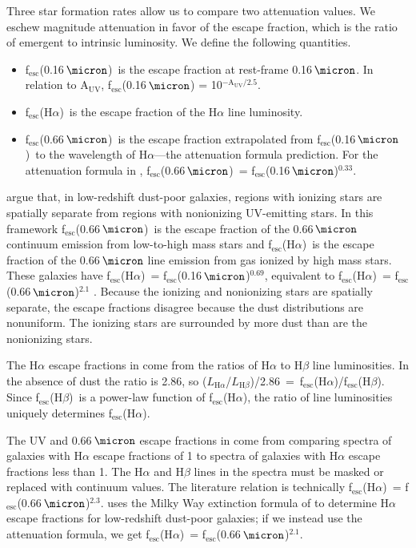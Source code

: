 \documentclass[preprint]{aastex}
\newcommand{\alephuv}{f$_{\mathrm{esc}}$(0.16$\,\micron$)}
\newcommand{\alephha}{f$_{\mathrm{esc}}$(H$\alpha$)}
\newcommand{\alephuvha}{f$_{\mathrm{esc}}$(0.66$\,\micron$)}
\newcommand{\alephhb}{f$_{\mathrm{esc}}$(H$\beta$)}
\begin{document}
Three star formation rates allow us to compare two attenuation values.
We eschew magnitude attenuation in favor of the escape fraction, which
is the ratio of emergent to intrinsic luminosity.  We define the following
quantities.
\begin{itemize}
\item \alephuv~is the escape fraction at rest-frame 0.16$\,\micron$.  In
relation to A$_{\mathrm{UV}}$,
f$_{\mathrm{esc}}$(0.16$\,\micron$) = 10$^{-\mathrm{A}_{\mathrm{UV}}/2.5}$.
\item \alephha~is the escape fraction of the H$\alpha$ line luminosity.
\item \alephuvha~is the escape fraction extrapolated from \alephuv~to the
wavelength of H$\alpha$---the attenuation formula prediction.  For the
attenuation formula in \citet{calzetti00}, \alephuvha~= \alephuv$^{0.33}$.
\end{itemize}

\citet{calzetti94} argue that, in low-redshift dust-poor galaxies, regions with
ionizing stars are spatially separate from regions with nonionizing
UV-emitting stars.  In this framework \alephuvha~is the escape fraction
of the 0.66$\,\micron$ continuum emission from low-to-high mass stars and
\alephha~is the escape fraction of the 0.66$\,\micron$ line emission from gas
ionized by high mass stars.  These galaxies have \alephha~= \alephuv$^{0.69}$,
equivalent to \alephha~= \alephuvha$^{2.1}$ \citep{calzetti94,calzetti97b}.
Because the ionizing and nonionizing stars are spatially separate, the
escape fractions disagree because the dust distributions are nonuniform.  The
ionizing stars are surrounded by more dust than are the nonionizing stars.

The H$\alpha$ escape fractions in \citet{calzetti94} come from the ratios of
H$\alpha$ to H$\beta$
line luminosities.  In the absence of dust the ratio is 2.86, so
($L_{\mathrm{H}\alpha}$/$L_{\mathrm{H}\beta}$)/2.86~=~\alephha/\alephhb.  Since
\alephhb~is a power-law function of \alephha, the ratio of line luminosities
uniquely determines \alephha.

The UV and 0.66$\,\micron$ escape fractions in \citet{calzetti94} come from
comparing spectra of
galaxies with H$\alpha$ escape fractions of 1 to spectra of galaxies with
H$\alpha$ escape fractions less than 1.  The H$\alpha$ and H$\beta$ lines in
the spectra must be masked or replaced with continuum values.  The literature
relation is technically
\alephha~= \alephuvha$^{2.3}$.  \citet{calzetti97b} uses the Milky Way
extinction formula of \citet{howarth83} to determine H$\alpha$ escape
fractions for low-redshift dust-poor galaxies; if we instead use the
attenuation formula, we get \alephha~= \alephuvha$^{2.1}$.
\end{document}
